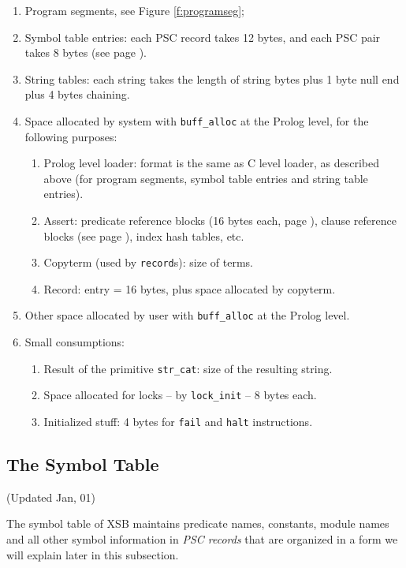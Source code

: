 \documentclass[11pt]{article}
\begin{document}
\begin{enumerate}
\item  Program segments, see Figure \ref{f:programseg};
\item  Symbol table entries: each PSC record takes 12 bytes,
   and each PSC pair takes 8 bytes (see page \pageref{pg:symtab}).
\item  String tables: each string takes the length of string bytes
   plus 1 byte null end plus 4 bytes chaining.
\item  Space allocated by system with {\tt buff\_alloc} at the Prolog level,
   for the following purposes:
   \begin{enumerate}
	\item Prolog level loader: format is the same as C level loader, as
	  described above (for program segments, symbol table entries and
	  string table entries).
	\item Assert: predicate reference blocks (16 bytes each, page 
	  \pageref{pg:predref}), clause reference blocks (see page
	  \pageref{pg:clauseref}), index hash tables, etc.
	\item Copyterm (used by {\tt record}s): size of terms.
	\item Record: entry = 16 bytes, plus space allocated by copyterm.
   \end{enumerate}
\item  Other space allocated by user with {\tt buff\_alloc} at the 
	Prolog level.
\item  Small consumptions:
   \begin{enumerate}
	\item Result of the primitive {\tt str\_cat}: size of the resulting
	  string.
	\item Space allocated for locks -- by {\tt lock\_init} -- 8 bytes each.
	\item Initialized stuff: 4 bytes for {\tt fail} and {\tt halt} 
		instructions.
   \end{enumerate}
\end{enumerate}


\subsection{The Symbol Table} (Updated Jan, 01)

\label{pg:symtab}
The symbol table of XSB maintains predicate names, constants, module
names and all other symbol information in {\em PSC records} that are
organized in a form we will explain later in this subsection.  
\end{document}
